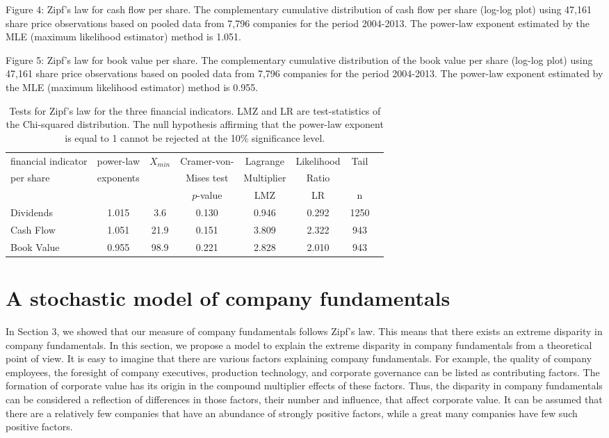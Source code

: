 \documentclass[10pt,a4paper]{article}
\begin{document}
Figure 4: Zipf's law for cash flow per share. The complementary cumulative distribution of cash flow per share (log-log plot) using 47,161 share price observations based on pooled data from 7,796 companies for the period 2004-2013. The power-law exponent estimated by the MLE (maximum likelihood estimator) method is 1.051.

Figure 5: Zipf's law for book value per share. The complementary cumulative distribution of the book value per share (log-log plot) using 47,161 share price observations based on pooled data from 7,796 companies for the period 2004-2013. The power-law exponent estimated by the MLE (maximum likelihood estimator) method is 0.955. 

\begin{table}[H]
\begin{center}
\begin{tabular}{lccccccc} \hline
financial  indicator & power-law  & $X_{min}$ & Cramer-von-& Lagrange&Likelihood & Tail\\
per share     & exponents     &        &  Mises test& Multiplier& Ratio& \\  
      &        &        &  $p$-value   &LMZ  &  LR  & n \\ \hline 
Dividends  & 1.015 & 3.6 &0.130 & 0.946 & 0.292 & 1250 \\ 
Cash Flow & 1.051 & 21.9 & 0.151 &  3.809 & 2.322 & 943 \\ 
Book Value & 0.955 & 98.9 & 0.221 &  2.828 & 2.010 & 943 \\ \hline
\end{tabular}
\end{center} 
\caption{Tests for Zipf's law for the three financial indicators. LMZ and LR are test-statistics of the Chi-squared distribution. The null hypothesis affirming that the power-law exponent is equal to 1 cannot be rejected at the 10\% significance level.}
\end{table}

\section{A stochastic model of company fundamentals}

In Section 3, we showed that our measure of company fundamentals follows Zipf's law. This means that there exists an extreme disparity in company fundamentals. In this section, we propose a model to explain the extreme disparity in company fundamentals from a theoretical point of view. It is easy to imagine that there are various factors explaining company fundamentals. For example, the quality of company employees, the foresight of company executives, production technology, and corporate governance can be listed as contributing factors. The formation of corporate value has its origin in the compound multiplier effects of these factors. Thus, the disparity in company fundamentals can be considered a reflection of differences in those factors, their number and influence, that affect corporate value. It can be assumed that there are a relatively few companies that have an abundance of strongly positive factors, while a great many companies have few such positive factors.
 
\end{document}
